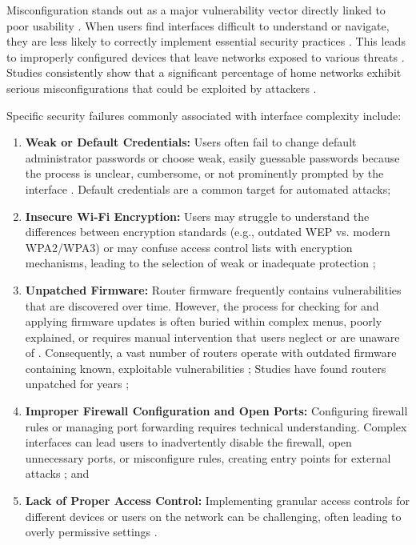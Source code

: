 Misconfiguration stands out as a major vulnerability vector directly linked to poor usability \cite{ai_networking}. When users find interfaces difficult to understand or navigate, they are less likely to correctly implement essential security practices \cite{home_network_challenges}. This leads to improperly configured devices that leave networks exposed to various threats \cite{home_network_challenges}. Studies consistently show that a significant percentage of home networks exhibit serious misconfigurations that could be exploited by attackers \cite{home_network_challenges}.

Specific security failures commonly associated with interface complexity include:

\begin{enumerate}
\item \textbf{Weak or Default Credentials:} Users often fail to change default administrator passwords or choose weak, easily guessable passwords because the process is unclear, cumbersome, or not prominently prompted by the interface \cite{router_password_study}. Default credentials are a common target for automated attacks;

\item \textbf{Insecure Wi-Fi Encryption:} Users may struggle to understand the differences between encryption standards (e.g., outdated WEP vs. modern WPA2/WPA3) or may confuse access control lists with encryption mechanisms, leading to the selection of weak or inadequate protection \cite{home_network_challenges};

\item \textbf{Unpatched Firmware:} Router firmware frequently contains vulnerabilities that are discovered over time. However, the process for checking for and applying firmware updates is often buried within complex menus, poorly explained, or requires manual intervention that users neglect or are unaware of \cite{router_password_study}. Consequently, a vast number of routers operate with outdated firmware containing known, exploitable vulnerabilities \cite{router_exploitable}; Studies have found routers unpatched for years \cite{router_exploitable};

\item \textbf{Improper Firewall Configuration and Open Ports:} Configuring firewall rules or managing port forwarding requires technical understanding. Complex interfaces can lead users to inadvertently disable the firewall, open unnecessary ports, or misconfigure rules, creating entry points for external attacks \cite{router_password_study}; and

\item \textbf{Lack of Proper Access Control:} Implementing granular access controls for different devices or users on the network can be challenging, often leading to overly permissive settings \cite{router_password_study}.
\end{enumerate}

